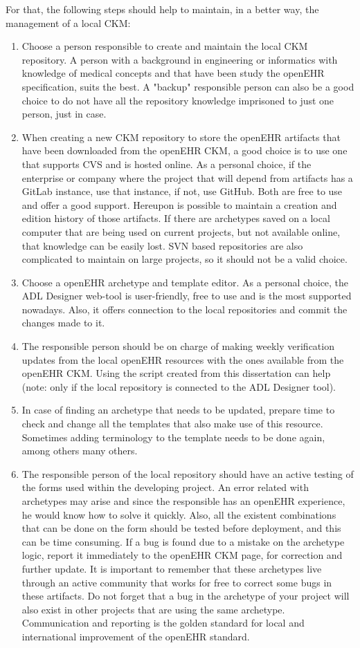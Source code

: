 \documentclass[mim_thesis.tex]{subfiles}
\begin{document}
For that, the following steps should help to maintain, in a better way, the management of a local CKM: 
\begin{enumerate}
\item Choose a person responsible to create and maintain the local CKM repository. A person with a background in engineering or informatics with knowledge of medical concepts and that have been study the openEHR specification, suits the best. A "backup" responsible person can also be a good choice to do not have all the repository knowledge imprisoned to just one person, just in case.
\item When creating a new CKM repository to store the openEHR artifacts that have been downloaded from the openEHR CKM, a good choice is to use one that supports \ac{CVS} and is hosted online. As a personal choice, if the enterprise or company where the project that will depend from artifacts has a GitLab instance, use that instance, if not, use GitHub. Both are free to use and offer a good support. Hereupon is possible to maintain a creation and edition history of those artifacts. If there are archetypes saved on a local computer that are being used on current projects, but not available online, that knowledge can be easily lost. \ac{SVN} based repositories are also complicated to maintain on large projects, so it should not be a valid choice. 
\item Choose a openEHR archetype and template editor. As a personal choice, the ADL Designer web-tool is user-friendly, free to use and is the most supported nowadays. Also, it offers connection to the local repositories and commit the changes made to it.  
\item The responsible person should be on charge of making weekly verification updates from the local openEHR resources with the ones available from the openEHR CKM. Using the script created from this dissertation can help (note: only if the local repository is connected to the ADL Designer tool). 
\item In case of finding an archetype that needs to be updated, prepare time to check and change all the templates that also make use of this resource. Sometimes adding terminology to the template needs to be done again, among others many others.
\item The responsible person of the local repository should have an active testing of the forms used within the developing project. An error related with archetypes may arise and since the responsible has an openEHR experience, he would know how to solve it quickly. Also, all the existent combinations that can be done on the form should be tested before deployment, and this can be time consuming. If a bug is found due to a mistake on the archetype logic, report it immediately to the openEHR CKM page, for correction and further update. It is important to remember that these archetypes live through an active community that works for free to correct some bugs in these artifacts. Do not forget that a bug in the archetype of your project will also exist in other projects that are using the same archetype. Communication and reporting is the golden standard for local and international improvement of the openEHR standard.

\end{enumerate}
\end{document}

